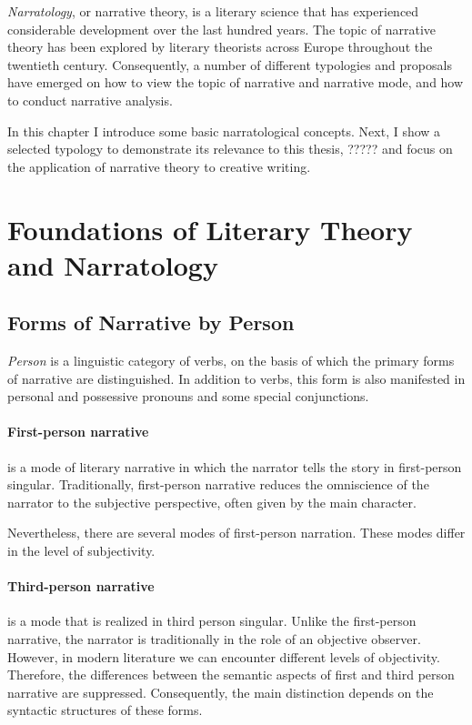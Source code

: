 \emph{Narratology}, or narrative theory, is a literary science that has experienced considerable development over the last hundred years. The topic of narrative theory has been explored by literary theorists across Europe throughout the twentieth century. Consequently, a number of different typologies and proposals have emerged on how to view the topic of narrative and narrative mode, and how to conduct narrative analysis. \cite{kubicek-vypravec}

In this chapter I introduce some basic narratological concepts. Next, I show a selected typology to demonstrate its relevance to this thesis, ????? and focus on the application of narrative theory to creative writing.

\section{Foundations of Literary Theory and Narratology}


\subsection{Forms of Narrative by Person}

\emph{Person} is a linguistic category of verbs, on the basis of which the primary forms of narrative are distinguished. In addition to verbs, this form is also manifested in personal and possessive pronouns and some special conjunctions.

\paragraph{First-person narrative} is a mode of literary narrative in which the narrator tells the story in first-person singular. Traditionally, first-person narrative reduces the omniscience of the narrator to the subjective perspective, often given by the main character.\cite{vlasin-slovnik}

Nevertheless, there are several modes of first-person narration. These modes differ in the level of subjectivity. \cite{dolezel-narativni-zpusoby}

\paragraph{Third-person narrative} is a mode that is realized in third person singular. Unlike the first-person narrative, the narrator is traditionally in the role of an objective observer. However, in modern literature we can encounter different levels of objectivity. Therefore, the differences between the semantic aspects of first and third person narrative are suppressed. Consequently, the main distinction depends on the syntactic structures of these forms. \cite{vlasin-slovnik}

